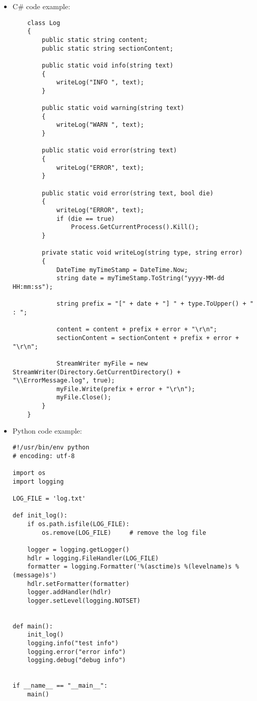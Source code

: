 \documentclass{article}
\begin{document}
\begin{itemize}
\item
C\# code example:
\begin{lstlisting}
    class Log
    {
        public static string content;
        public static string sectionContent;

        public static void info(string text)
        {
            writeLog("INFO ", text);
        }

        public static void warning(string text)
        {
            writeLog("WARN ", text);
        }

        public static void error(string text)
        {
            writeLog("ERROR", text);
        }

        public static void error(string text, bool die)
        {
            writeLog("ERROR", text);
            if (die == true)
                Process.GetCurrentProcess().Kill();
        }

        private static void writeLog(string type, string error)
        {
            DateTime myTimeStamp = DateTime.Now;
            string date = myTimeStamp.ToString("yyyy-MM-dd HH:mm:ss");

            string prefix = "[" + date + "] " + type.ToUpper() + " : ";

            content = content + prefix + error + "\r\n";
            sectionContent = sectionContent + prefix + error + "\r\n";

            StreamWriter myFile = new StreamWriter(Directory.GetCurrentDirectory() + "\\ErrorMessage.log", true);
            myFile.Write(prefix + error + "\r\n");
            myFile.Close();
        }
    }
\end{lstlisting}
\item
Python code example:
\begin{lstlisting}
#!/usr/bin/env python
# encoding: utf-8

import os
import logging

LOG_FILE = 'log.txt'

def init_log():
    if os.path.isfile(LOG_FILE):
        os.remove(LOG_FILE)     # remove the log file

    logger = logging.getLogger()
    hdlr = logging.FileHandler(LOG_FILE)
    formatter = logging.Formatter('%(asctime)s %(levelname)s %(message)s')
    hdlr.setFormatter(formatter)
    logger.addHandler(hdlr)
    logger.setLevel(logging.NOTSET)


def main():
    init_log()
    logging.info("test info")
    logging.error("error info")
    logging.debug("debug info")


if __name__ == "__main__":
    main()
\end{lstlisting}
\end{itemize}
\end{document}
